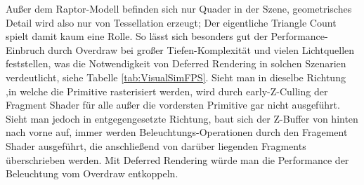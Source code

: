 	
	Außer dem Raptor-Modell befinden sich nur Quader in der Szene, geometrisches Detail wird also
	nur von Tessellation erzeugt; Der eigentliche Triangle Count spielt damit kaum eine Rolle.
	So lässt sich besonders gut der Performance-Einbruch durch Overdraw bei großer Tiefen-Komplexität und vielen
	Lichtquellen feststellen, was die Notwendigkeit von Deferred Rendering in solchen Szenarien verdeutlicht,
	siehe Tabelle \ref{tab:VisualSimFPS}. Sieht man in dieselbe Richtung ,in welche die Primitive rasterisiert werden,
	wird durch early-Z-Culling der Fragment Shader für alle außer die vordersten Primitive gar nicht ausgeführt.
	Sieht man jedoch in entgegengesetzte Richtung, baut sich der Z-Buffer von hinten nach vorne auf, immer werden 
	Beleuchtungs-Operationen durch den Fragement Shader ausgeführt, die anschließend von darüber liegenden
	Fragments überschrieben werden. Mit Deferred Rendering würde man die Performance der Beleuchtung 
	vom Overdraw entkoppeln.
	


